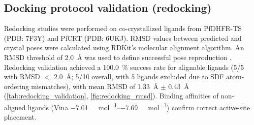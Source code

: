 \documentclass[journal=jcisd8,manuscript=suppinfo]{achemso}
\begin{document}
\subsection*{Docking protocol validation (redocking)}

Redocking studies were performed on co-crystallized ligands from PfDHFR-TS (PDB: 7F3Y) and PfCRT (PDB: 6UKJ). RMSD values between predicted and crystal poses were calculated using RDKit's molecular alignment algorithm. An RMSD threshold of \qty{2.0}{\angstrom} was used to define successful pose reproduction \cite{Eberhardt2021}. Redocking validation achieved a \qty{100.0}{\percent} success rate for alignable ligands (5/5 with RMSD $<$ \qty{2.0}{\angstrom}; 5/10 overall, with 5 ligands excluded due to SDF atom-ordering mismatches), with mean RMSD of \qty{1.33}{\angstrom} $\pm$ \qty{0.43}{\angstrom} (\cref{tab:redocking_validation}, \cref{fig:redocking_rmsd}). Binding affinities of non-aligned ligands (Vina \qtyrange{-7.01}{-7.69}{\kilo\calorie\per\mole}) confirm correct active-site placement.
\end{document}
